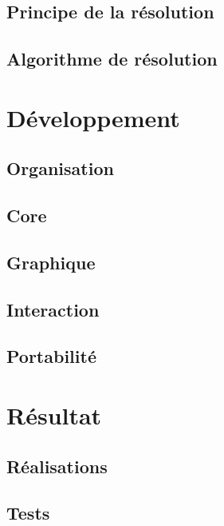 \documentclass[a4paper,10pt]{report}
\begin{document}
\chapter{Principe de la résolution}

\chapter{Algorithme de résolution}


\part{Développement}
\chapter{Organisation}

\chapter{Core}\label{ch6}

\chapter{Graphique}

\chapter{Interaction}

\chapter{Portabilité}


\part{Résultat}
\chapter{Réalisations}

\chapter{Tests}\label{Tests}


\listoffigures
\listoftables
\lstlistoflistings

\printindex
\end{document}
